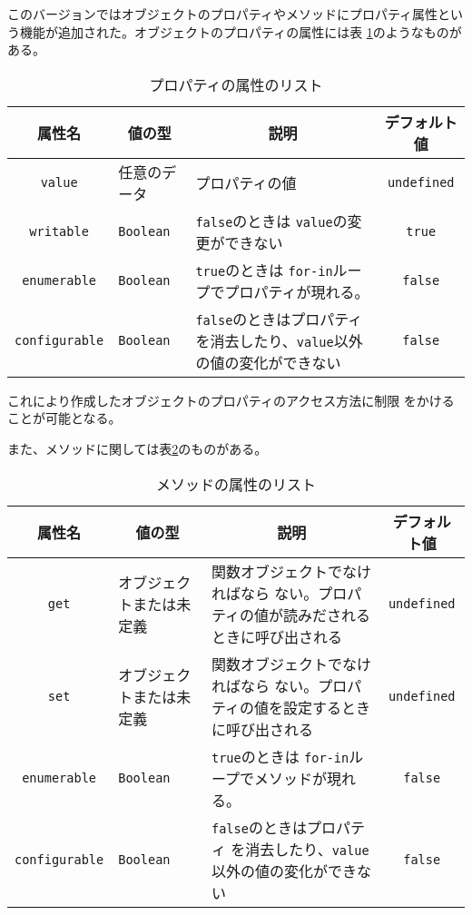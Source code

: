このバージョンではオブジェクトのプロパティやメソッドにプロパティ属性とい
う機能が追加された。オブジェクトのプロパティの属性には表
\ref{PropAttribute}のようなものがある。
\begin{table}[ht]
 \caption{プロパティの属性のリスト}\label{PropAttribute}
\begin{center}
 \begin{tabular}{|c|m{}|m{}|c|}\hline
 属性名 & \multicolumn{1}{c|}{値の型}& \multicolumn{1}{c|}{説明}&
デフォルト値\\\hline
  \texttt{value}& 任意のデータ&プロパティの値&\texttt{undefined}\\ \hline
  \texttt{writable}&\texttt{Boolean}& \texttt{false}のときは
	  \texttt{value}の変更ができない&\texttt{true}\\ \hline
  \texttt{enumerable}&\texttt{Boolean}& \texttt{true}のときは
	  \texttt{for-in}ループでプロパティが現れる。&\texttt{false}\\ \hline
  \texttt{configurable}&\texttt{Boolean}&\texttt{false}のときはプロパティ
	  を消去したり、\texttt{value}以外の値の変化ができない&\texttt{false}\\ \hline
 \end{tabular}
\end{center}
\end{table}

これにより作成したオブジェクトのプロパティのアクセス方法に制限
をかけることが可能となる。

また、メソッドに関しては表\ref{MethodAttribute}のものがある。
\begin{table}[ht]
 \caption{メソッドの属性のリスト}\label{MethodAttribute}
\begin{center}
 \begin{tabular}{|c|m{}|m{}|c|}\hline
 属性名 & \multicolumn{1}{c|}{値の型}& \multicolumn{1}{c|}{説明}& デフォルト値 \\\hline
  \texttt{get}& オブジェクトまたは未定義&関数オブジェクトでなければなら
	  ない。プロパティの値が読みだされるときに呼び出される&\texttt{undefined}\\ \hline
  \texttt{set}&オブジェクトまたは未定義& 関数オブジェクトでなければなら
	  ない。プロパティの値を設定するときに呼び出される&\texttt{undefined}\\ \hline
  \texttt{enumerable}&\texttt{Boolean}& \texttt{true}のときは
	  \texttt{for-in}ループでメソッドが現れる。&\texttt{false}\\ \hline
  \texttt{configurable}&\texttt{Boolean}&\texttt{false}のときはプロパティ
	  を消去したり、\texttt{value}以外の値の変化ができない&\texttt{false}\\ \hline
 \end{tabular}
\end{center}
\end{table}

